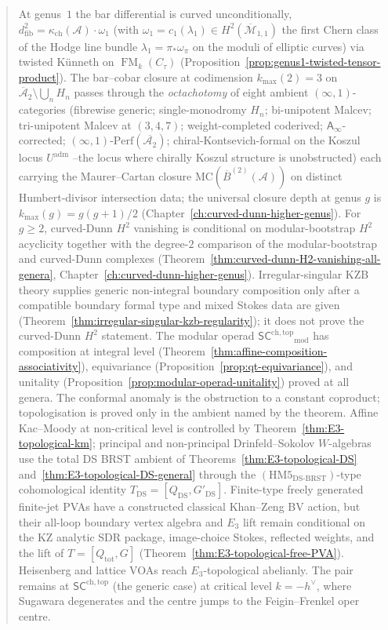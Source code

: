 \documentclass[11pt]{memoir}
\DeclareMathOperator{\FM}{FM}
\newcommand{\cA}{\mathcal{A}}
\newcommand{\Ainf}{\mathsf{A}_{\infty}}
\newcommand{\SCchtop}{{\mathsf{SC}^{\mathrm{ch,top}}}}
\providecommand{\hypDSBRST}{(\mathrm{HM5}_{\mathrm{DS\text{-}BRST}})}
\begin{document}
\begin{abstract}
At genus~$1$ the bar differential is curved unconditionally,
$d^2_{\mathrm{fib}} = \kappa_{\mathrm{ch}}(\cA) \cdot \omega_1$
(with $\omega_1 = c_1(\lambda_1) \in H^2(\overline{\mathcal M}_{1,1})$
the first Chern class of the Hodge line bundle
$\lambda_1 = \pi_*\omega_\pi$ on the moduli of elliptic curves)
via twisted K\"unneth on $\FM_k(C_\tau)$
(Proposition~\ref{prop:genus1-twisted-tensor-product}). The
bar--cobar closure at codimension $k_{\max}(2) = 3$ on
$\overline{\mathcal A}_2 \setminus \bigcup_n H_n$ passes through
the \emph{octachotomy} of eight ambient $(\infty,1)$-categories
(fibrewise generic; single-monodromy $H_n$; bi-unipotent Malcev;
tri-unipotent Malcev at $(3,4,7)$; weight-completed coderived;
$\Ainf$-corrected; $(\infty,1)$-$\mathrm{Perf}(\overline{\mathcal A_2})$;
chiral-Kontsevich-formal on the Koszul locus $U^{\mathrm{adm}}$
--the locus where chirally Koszul structure is unobstructed)
each carrying the Maurer--Cartan closure $\mathrm{MC}(\overline
B^{(2)}(\cA))$ on distinct Humbert-divisor intersection data;
the universal closure depth at genus $g$ is
$k_{\max}(g) = g(g+1)/2$ (Chapter~\ref{ch:curved-dunn-higher-genus}).
For $g \ge 2$, curved-Dunn $H^2$ vanishing is conditional on
modular-bootstrap $H^2$ acyclicity together with the degree-$2$
comparison of the modular-bootstrap and curved-Dunn complexes
(Theorem~\ref{thm:curved-dunn-H2-vanishing-all-genera},
Chapter~\ref{ch:curved-dunn-higher-genus}). Irregular-singular
KZB theory supplies generic non-integral boundary composition only
after a compatible boundary formal type and mixed Stokes data are
given
(Theorem~\ref{thm:irregular-singular-kzb-regularity}); it does not
prove the curved-Dunn $H^2$ statement. The
modular operad $\SCchtop_{\mathrm{mod}}$ has composition at
integral level
(Theorem~\ref{thm:affine-composition-associativity}),
equivariance (Proposition~\ref{prop:qt-equivariance}), and
unitality (Proposition~\ref{prop:modular-operad-unitality})
proved at all genera. The conformal anomaly is the obstruction
to a constant coproduct; topologisation is proved only in the
ambient named by the theorem. Affine Kac--Moody at non-critical
level is controlled by Theorem~\ref{thm:E3-topological-km};
principal and non-principal Drinfeld--Sokolov $W$-algebras use the
total DS BRST ambient of
Theorems~\ref{thm:E3-topological-DS}
and~\ref{thm:E3-topological-DS-general}
through the \(\hypDSBRST\)-type cohomological identity
\(T_{\mathrm{DS}} = [Q_{\mathrm{DS}}, G'_{\mathrm{DS}}]\). Finite-type
freely generated finite-jet PVAs have a constructed classical
Khan--Zeng BV action, but their all-loop boundary vertex algebra and
$E_3$ lift remain conditional on the KZ analytic SDR package,
image-choice Stokes, reflected weights, and the lift of
$T=[Q_{\mathrm{tot}},G]$
(Theorem~\ref{thm:E3-topological-free-PVA}). Heisenberg and
lattice VOAs reach $E_3$-topological abelianly. The pair
remains at $\SCchtop$ (the generic case) at critical level
$k = -h^\vee$, where Sugawara degenerates and the centre
jumps to the Feigin--Frenkel oper centre.


\end{abstract}
\end{document}
